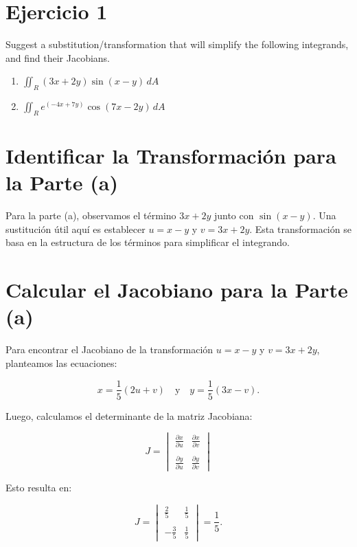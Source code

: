 \section{Ejercicio 1}
Suggest a substitution/transformation that will simplify the following integrands, and find their Jacobians.

\begin{enumerate}[label=(\alph*), itemsep=0.4em, topsep=0.5em]
	\item $\displaystyle \iint_R (3x + 2y) \sin(x - y)\, dA$
	\item $\displaystyle \iint_R e^{(-4x + 7y)} \cos(7x - 2y)\, dA$
\end{enumerate}

\section*{Identificar la Transformación para la Parte (a)}

Para la parte (a), observamos el término \(3x + 2y\) junto con \(\sin(x-y)\). Una sustitución útil aquí es establecer \(u = x - y\) y \(v = 3x + 2y\). Esta transformación se basa en la estructura de los términos para simplificar el integrando.

\section*{Calcular el Jacobiano para la Parte (a)}

Para encontrar el Jacobiano de la transformación \(u = x - y\) y \(v = 3x + 2y\), planteamos las ecuaciones:

\[
x = \frac{1}{5}(2u + v) \quad \text{y} \quad y = \frac{1}{5}(3x - v).
\]

Luego, calculamos el determinante de la matriz Jacobiana:

\[
J = 
\begin{vmatrix}
\frac{\partial x}{\partial u} & \frac{\partial x}{\partial v} \\\\
\frac{\partial y}{\partial u} & \frac{\partial y}{\partial v}
\end{vmatrix}
\]

Esto resulta en:

\[
J = \begin{vmatrix}
\frac{2}{5} & \frac{1}{5} \\\\
-\frac{3}{5} & \frac{1}{5}
\end{vmatrix}
= \frac{1}{5}.
\]

